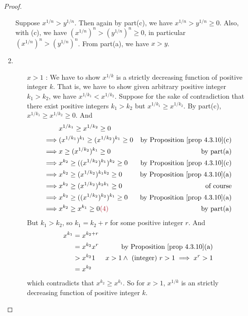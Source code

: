 \begin{proof}
\begin{enumerate}
    Suppose \(x^{1/n} > y^{1/n}\).
    Then again by part(c), we have \(x^{1/n} > y^{1/n} \ge 0\).
    Also, with (c), we have \((x^{1/n})^n > (y^{1/n})^n \ge 0\), in particular  \((x^{1/n})^n > (y^{1/n})^n\).
    From part(a), we have \(x > y\).
\item
    \begin{itemize}
    \item[\(x > 1\)]:
        We have to show \(x^{1/k}\) is a strictly decreasing function of positive integer \(k\).
        That is, we have to show given arbitrary positive integer \(k_1 > k_2\), we have \(x^{1/k_1} < x^{1/k_2}\).
        Suppose for the sake of contradiction that there exist positive integers \(k_1 > k_2\) but \(x^{1/k_1} \ge x^{1/k_2}\).
        By part(c), \(x^{1/k_1} \ge x^{1/k_2} \ge 0\). And
        \begin{align*}
                     & x^{1/k_1} \ge x^{1/k_2} \ge 0 \\
            \implies & (x^{1/k_1})^{k_1} \ge (x^{1/k_2})^{k_1} \ge 0 & \text{by \PROP{4.3.10}(c)} \\
            \implies & x \ge (x^{1/k_2})^{k_1} \ge 0 & \text{by part(a)} \\
            \implies & x^{k_2} \ge ((x^{1/k_2})^{k_1})^{k_2} \ge 0 & \text{by \PROP{4.3.10}(c)} \\
            \implies & x^{k_2} \ge (x^{1/k_2})^{k_1 k_2} \ge 0 & \text{by \PROP{4.3.10}(a)} \\
            \implies & x^{k_2} \ge (x^{1/k_2})^{k_2 k_1} \ge 0 & \text{of course} \\
            \implies & x^{k_2} \ge ((x^{1/k_2})^{k_2})^{k_1} \ge 0 & \text{by \PROP{4.3.10}(a)} \\
            \implies & x^{k_2} \ge x^{k_1} \ge 0 \MAROON{(4)} & \text{by part(a)}
        \end{align*}
        But \(k_1 > k_2\), so \(k_1 = k_2 + r\) for some positive integer \(r\).
        And
        \begin{align*}
            x^{k_1} & = x^{k_2 + r} \\
                    & = x^{k_2} x^{r} & \text{by \PROP{4.3.10}(a)} \\
                    & > x^{k_2} 1 & \text{\(x > 1 \land \text{ (integer) } r > 1 \implies x^r > 1\)} \\
                    & = x^{k_2}
        \end{align*}
        which contradicts  that \(x^{k_2} \ge x^{k_1}\).
        So for \(x > 1\), \(x^{1/k}\) is an strictly decreasing function of positive integer \(k\).

\end{itemize}
\end{enumerate}
\end{proof}
